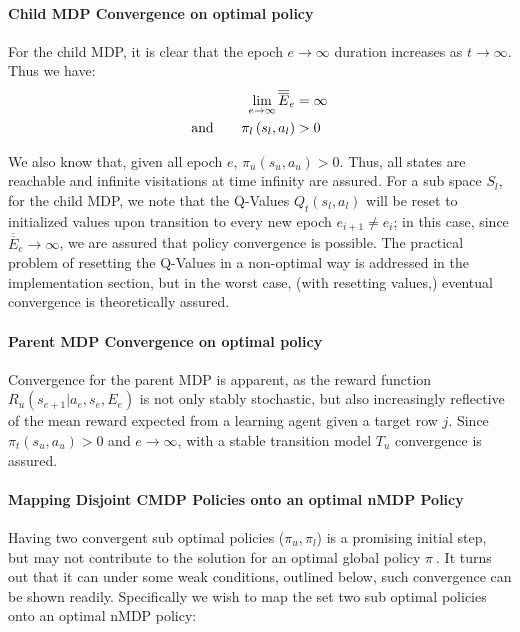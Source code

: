 \documentclass[compsoc,journal,letterpaper,10pt,draftcls,twocolumn]{IEEEtran}
\begin{document}
\paragraph{Child MDP Convergence on optimal
policy}\label{child-mdp-convergence-on-optimal-policy}

For the child MDP, it is clear that the epoch \(e \rightarrow \infty\)
duration increases as \(t \rightarrow \infty\). Thus we have:
\begin{align}
\lim_{e\rightarrow\infty}
\overline{\overline{E}}_{e} &= \infty \notag\\ 
\textrm{and}\qquad
\pi_{l}\left( s_{l}, a_{l} \right) &> 0
\end{align} 

We also know that, given all epoch \(e\),
\(\pi_{u}\left( s_{u},a_{u} \right) > 0\). Thus, all states are
reachable and infinite visitations at time infinity are assured. For a
sub space \(S_{l}\), for the child MDP, we note that the Q-Values
\(Q_{t}(s_{l},a_{l})\) will be reset to initialized values upon
transition to every new epoch \(e_{i + 1} \neq e_{i}\); in this case,
since \(\overline{\overline E}_{e} \rightarrow \infty\), we are assured that
policy convergence is possible. The practical problem of resetting the
Q-Values in a non-optimal way is addressed in the implementation
section, but in the worst case, (with resetting values,) eventual
convergence is theoretically assured.

\paragraph{Parent MDP Convergence on optimal
policy}\label{parent-mdp-convergence-on-optimal-policy}

Convergence for the parent MDP is apparent, as the reward function
\(R_{u}\left( s_{e + 1}|a_{e},s_{e},E_{e} \right)\) is not only stably
stochastic, but also increasingly reflective of the mean reward expected
from a learning agent given a target row \(j\). Since
\(\pi_{t}\left( s_{u},a_{u} \right) > 0\) and \(e \rightarrow \infty\),
with a stable transition model \(T_{u}\) convergence is assured.

\paragraph{Mapping Disjoint CMDP Policies onto an optimal nMDP
Policy}\label{mapping-disjoint-cmdp-policies-onto-an-optimal-nmdp-policy}

Having two convergent sub optimal policies (\(\pi_{u},\pi_{l}\)) is a
promising initial step, but may not contribute to the solution for an
optimal global policy \(\pi_{\ }.\) It turns out that it can under some
weak conditions, outlined below, such convergence can be shown readily.
Specifically we wish to map the set two sub optimal policies onto an
optimal nMDP policy:
\end{document}
